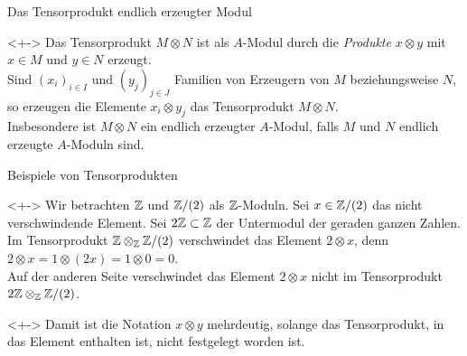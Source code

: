 \begin{frame}{Das Tensorprodukt endlich erzeugter Modul}
	\begin{remark}<+->
		Das Tensorprodukt \(M \otimes N\) ist als \(A\)-Modul durch die \emph{Produkte} \(x \otimes y\) mit
		\(x \in M\) und  \(y \in N\) erzeugt.
		\\
		Sind \((x_i)_{i \in I}\) und \((y_j)_{j \in J}\) Familien von Erzeugern von \(M\) beziehungsweise
		\(N\), so erzeugen die Elemente \(x_i \otimes y_j\) das Tensorprodukt \(M \otimes N\).
		\\
		Insbesondere ist \(M \otimes N\) ein endlich erzeugter \(A\)-Modul, falls \(M\) und \(N\) endlich
		erzeugte \(A\)-Moduln sind.
	\end{remark}
\end{frame}

\begin{frame}{Beispiele von Tensorprodukten}
	\begin{example}<+->
		Wir betrachten \(\mathbb Z\) und \(\mathbb Z/(2)\) als \(\mathbb Z\)-Moduln. Sei \(x \in \mathbb Z/(2)\) das
		nicht verschwindende Element. Sei \(2 \mathbb Z \subset \mathbb Z\) der Untermodul der geraden ganzen
		Zahlen.
		\\
		Im Tensorprodukt \(\mathbb Z \otimes_{\mathbb Z} \mathbb Z/(2)\) verschwindet das Element \(2 \otimes x\), denn
		\(2 \otimes x = 1 \otimes (2x) = 1 \otimes 0 = 0\).
		\\
		Auf der anderen Seite verschwindet das Element \(2 \otimes x\) nicht im Tensorprodukt
		\(2 \mathbb Z \otimes_{\mathbb Z} \mathbb Z/(2)\).
	\end{example}
	\begin{visibleenv}<+->
		Damit ist die Notation \(x \otimes y\) mehrdeutig, solange das Tensorprodukt, in das Element enthalten
		ist, nicht festgelegt worden ist.
	\end{visibleenv}
\end{frame}

